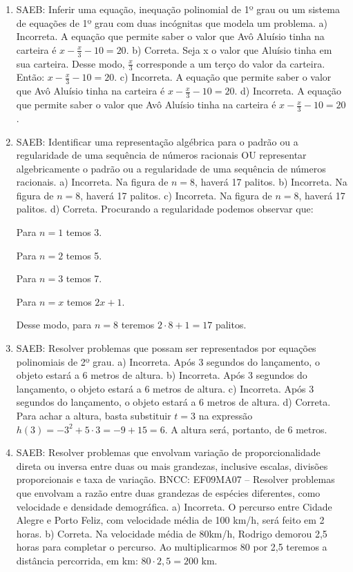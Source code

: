 \begin{enumerate}
\item
SAEB: Inferir uma equação, inequação polinomial de 1º grau ou 
um sistema de equações de 1º grau com duas incógnitas que modela um 
problema.
a) Incorreta. A equação que permite saber o valor que Avô Aluísio tinha na carteira é 
$x - \frac{x}{3} - 10 = 20$. 
b) Correta. Seja x o valor que Aluísio tinha em sua carteira. Desse modo,
$\frac{x}{3}$ corresponde a um terço do valor da carteira. Então: 
$x - \frac{x}{3} - 10 = 20$.
c) Incorreta. A equação que permite saber o valor que Avô Aluísio tinha na carteira é 
$x - \frac{x}{3} - 10 = 20$. 
d) Incorreta. A equação que permite saber o valor que Avô Aluísio tinha na carteira é 
$x - \frac{x}{3} - 10 = 20$.

\item
SAEB: Identificar uma representação algébrica para o padrão ou a
regularidade de uma sequência de números racionais OU representar
algebricamente o padrão ou a regularidade de uma sequência de números
racionais.
a) Incorreta. Na figura de $n = 8$, haverá 17 palitos. 
b) Incorreta. Na figura de $n = 8$, haverá 17 palitos.
c) Incorreta. Na figura de $n = 8$, haverá 17 palitos.
d) Correta. Procurando a regularidade podemos observar que:

Para $n = 1$ temos 3.

Para $n = 2$ temos 5.

Para $n = 3$ temos 7.

Para $n = x$ temos $2x + 1$.

Desse modo, para $n = 8$ teremos $2 \cdot 8 + 1 = 17$ palitos.

\item
SAEB: Resolver problemas que possam ser representados por equações
polinomiais de 2º grau. 
a) Incorreta. Após 3 segundos do lançamento, o objeto estará a 6 metros de altura.
b) Incorreta. Após 3 segundos do lançamento, o objeto estará a 6 metros de altura.
c) Incorreta. Após 3 segundos do lançamento, o objeto estará a 6 metros de altura.
d) Correta. Para achar a altura, basta substituir $t = 3$ na expressão 
$h(3) = - 3^2 + 5 \cdot 3 = - 9 + 15 = 6$. A altura será, portanto, de 6 metros.

\item
SAEB: Resolver problemas que envolvam variação de
proporcionalidade direta ou inversa entre duas ou mais grandezas,
inclusive escalas, divisões proporcionais e taxa de variação.
BNCC: EF09MA07 -- Resolver problemas que envolvam a razão entre duas
grandezas de espécies diferentes, como velocidade e densidade
demográfica.
a) Incorreta. O percurso entre Cidade Alegre e Porto Feliz, com velocidade 
média de 100 km/h, será feito em 2 horas. 
b) Correta. Na velocidade média de 80km/h, Rodrigo demorou 2,5 horas para
completar o percurso. Ao multiplicarmos 80 por 2,5 teremos a distância
percorrida, em km: $80 \cdot 2,5 = 200$ km.


\end{enumerate}
